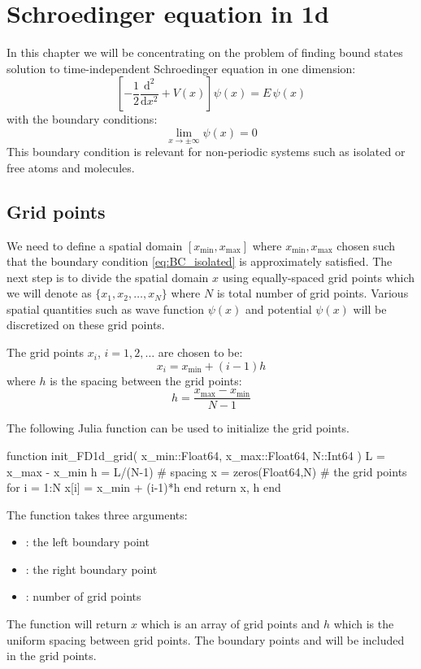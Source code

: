 \chapter{Schroedinger equation in 1d}
%
In this chapter we will be concentrating on the problem of
finding bound states solution to time-independent
Schroedinger equation in one dimension:
\begin{equation}
\left[ -\frac{1}{2}\frac{\mathrm{d}^2}{\mathrm{d}x^2} + V(x) \right] \psi(x) = E\, \psi(x)
\label{eq:Sch_1d_eq}
\end{equation}
%
with the boundary conditions:
%
\begin{equation}
\lim_{x \rightarrow \pm \infty} \psi(x) = 0
\label{eq:BC_isolated}
\end{equation}
%
This boundary condition is relevant for non-periodic systems such as
isolated or free atoms and molecules.

\section{Grid points}

We need to define a spatial domain $\left[x_{\mathrm{min}}, x_{\mathrm{max}}\right]$
where $x_{\mathrm{min}}, x_{\mathrm{max}}$ chosen
such that the boundary condition \ref{eq:BC_isolated} is approximately satisfied.
The next step is to divide the spatial domain $x$ using equally-spaced grid points
which we will denote as $\{x_{1},x_{2},\ldots,x_{N}\}$ where $N$ is total number
of grid points. Various spatial quantities such as wave function $\psi(x)$
and potential $\psi(x)$ will be discretized on these grid points.

The grid points $x_{i}$, $i = 1, 2, \ldots$ are chosen to be:
%
\begin{equation}
x_{i} = x_{\mathrm{min}} + (i-1)h
\end{equation}
%
where $h$ is the spacing between the grid points:
%
\begin{equation}
h = \frac{ x_{\mathrm{max}} - x_{\mathrm{min}} }{N-1}
\end{equation}

The following Julia function can be used to initialize the grid points.
\begin{juliacode}
function init_FD1d_grid(
    x_min::Float64,
    x_max::Float64,
    N::Int64
)
    L = x_max - x_min
    h = L/(N-1) # spacing
    x = zeros(Float64,N) # the grid points
    for i = 1:N
        x[i] = x_min + (i-1)*h
    end
    return x, h
end
\end{juliacode}
The function  takes three arguments:
\begin{itemize}
\item {}: the left boundary point
\item {}: the right boundary point
\item {}: number of grid points
\end{itemize}
The function will return $x$ which is an array of grid points and $h$ which
is the uniform spacing between grid points. The boundary points 
and  will be included in the grid points.


